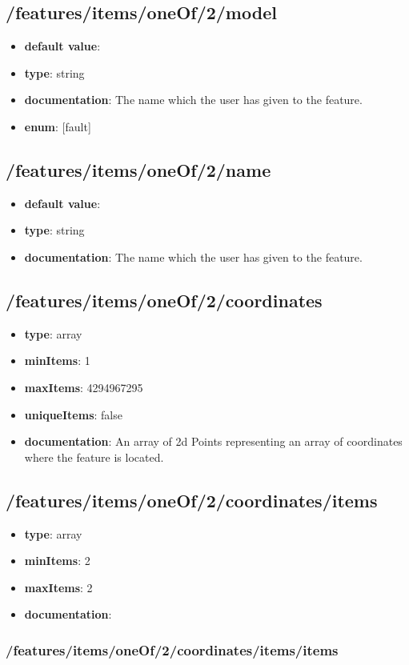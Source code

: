 \subsection{/features/items/oneOf/2/model}
\begin{itemize}\item {\bf default value}: 
\item {\bf type}: string
\item {\bf documentation}: The name which the user has given to the feature.
\item {\bf enum}: [fault]\end{itemize}\subsection{/features/items/oneOf/2/name}
\begin{itemize}\item {\bf default value}: 
\item {\bf type}: string
\item {\bf documentation}: The name which the user has given to the feature.
\end{itemize}\subsection{/features/items/oneOf/2/coordinates}
\begin{itemize}\item {\bf type}: array
\item {\bf minItems}: 1
\item {\bf maxItems}: 4294967295
\item {\bf uniqueItems}: false
\item {\bf documentation}: An array of 2d Points representing an array of coordinates where the feature is located.
\end{itemize}\subsection{/features/items/oneOf/2/coordinates/items}
\begin{itemize}\item {\bf type}: array
\item {\bf minItems}: 2
\item {\bf maxItems}: 2
\item {\bf documentation}: 
\end{itemize}\subsubsection{/features/items/oneOf/2/coordinates/items/items}
